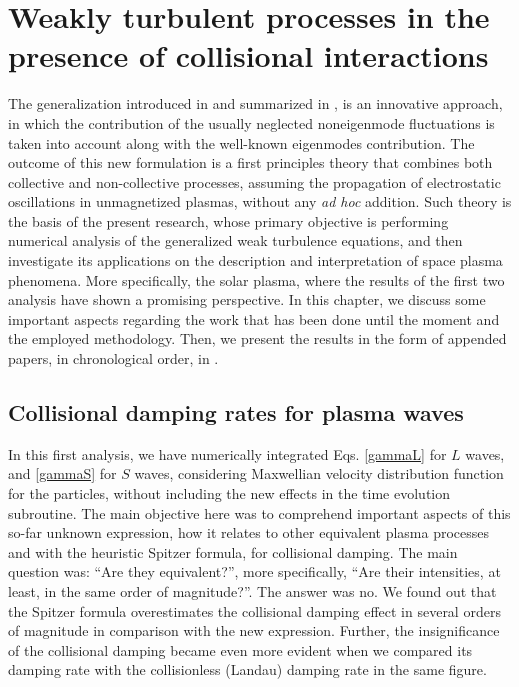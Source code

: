 \documentclass[12pt,a4paper,ruledheader]{report}
\begin{document}
\chapter{Weakly turbulent processes in the presence of
  collisional interactions}
\label{main}
The generalization introduced in \cite{YZKS16} and summarized
in , is an innovative approach, in
which the contribution of the usually neglected noneigenmode
fluctuations is taken into account along with the well-known
eigenmodes contribution. The outcome of this new formulation
is a first principles theory that combines both collective
and non-collective processes, assuming the propagation of
electrostatic oscillations in unmagnetized plasmas, without
any \emph{ad hoc} addition. Such theory is the basis of the
present research, whose primary objective is performing
numerical analysis of the generalized weak turbulence
equations, and then investigate its applications on the
description and interpretation of space plasma phenomena.
More specifically, the solar plasma, where the results of
the first two analysis \cite{Tigik2016b,Tigik2017a} have
shown a promising perspective. In this chapter, we discuss
some important aspects regarding the work that has been
done until the moment and the employed methodology. Then,
we present the results in the form of appended papers, in
chronological order, in .

\section{Collisional damping rates for plasma waves}
\label{coll-damp}
In this first analysis, we have numerically integrated Eqs. \eqref{gammaL}
for $L$ waves, and \eqref{gammaS} for $S$ waves, considering Maxwellian
velocity distribution function for the particles, without including the
new effects in the time evolution subroutine. The main objective here
was to comprehend important aspects of this so-far unknown expression,
how it relates to other equivalent plasma processes and with the
heuristic Spitzer formula, for collisional damping. The main question
was: ``Are they equivalent?'', more specifically, ``Are their intensities,
at least, in the same order of magnitude?''. The answer was no. We found
out that the Spitzer formula overestimates the collisional damping effect
in several orders of magnitude in comparison with the new expression.
Further, the insignificance of the collisional damping became even more
evident when we compared its damping rate with the collisionless (Landau)
damping rate in the same figure.
\end{document}

